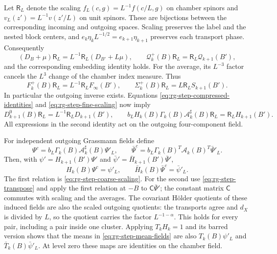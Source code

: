 \documentclass[11pt,letterpaper,reqno]{amsart}
\begin{document}
Let $\mathsf R_L$ denote the scaling
$f_L(c,g)=L^{-1}f(c/L,g)$ on chamber spinors and
$v_L(z')=L^{-1}v(z'/L)$ on unit spinors.
These are bijections between the corresponding
incoming and outgoing spaces. Scaling preserves
the label and the nested block centers, and
$e_k\eta_kL^{-1/2}=e_{k+1}\eta_{k+1}$ preserves
each transport phase. Consequently
\[
 (D_B+\mu)\mathsf R_L
       =L^{-1}\mathsf R_L(D_{B'}+L\mu),\qquad
 \mathcal Q_k^+(B)\mathsf R_L
       =\mathsf R_L\mathcal Q_{k+1}(B'),
\]
and the corresponding embedding identity holds.
For the average, its $L^{-3}$ factor cancels the
$L^3$ change of the chamber index measure.
Thus
\begin{equation}\label{eq:rg-step-fine-scaling}
 F_k^+(B)\mathsf R_L
                   =L^{-1}\mathsf R_LF_\infty(B'),\qquad
 \Sigma_k^+(B)\mathsf R_L
                         =L\mathsf R_LS_{k+1}(B').
\end{equation}
In particular the outgoing inverse exists.
Equations \eqref{eq:rg-step-compressed-identities} and
\eqref{eq:rg-step-fine-scaling} now imply
\begin{equation}\label{eq:rg-step-coarse-scaling}
 D_{k+1}^0(B)\mathsf R_L
                       =L^{-1}\mathsf R_LD_{k+1}(B'),\qquad
 b_LH_k(B)\Gamma_k(B)\mathcal A_k^\sharp(B)\mathsf R_L
                       =\mathsf R_LH_{k+1}(B').
\end{equation}
All expressions in the second identity act on the
outgoing four-component field.

For independent outgoing Grassmann fields define
\begin{equation}\label{eq:rg-step-mean-fields}
 \Psi^c=b_L\Gamma_k(B)\mathcal A_k^\sharp(B)\Psi'_L,\qquad
 \bar\Psi^c=b_L\Gamma_k(B)^T\mathcal A_k(B)^T\bar\Psi'_L.
\end{equation}
Then, with $\psi'=H_{k+1}(B')\Psi'$ and
$\bar\psi'=\bar H_{k+1}(B')\bar\Psi'$,
\begin{equation}\label{eq:rg-step-induced-fields}
 H_k(B)\Psi^c=\psi'_L,\qquad
 \bar H_k(B)\bar\Psi^c=\bar\psi'_L.
\end{equation}
The first relation is \eqref{eq:rg-step-coarse-scaling}.
For the second use \eqref{eq:rg-step-transpose}
and apply the first relation at $-B$ to
$\mathsf C\bar\Psi'$; the constant matrix
$\mathsf C$ commutes with scaling and the averages.
The covariant H\"older quotients of these induced
fields are also the scaled outgoing quotients:
the transports agree and $d_X$ is divided by $L$,
so the quotient carries the factor $L^{-1-\alpha}$.
This holds for every pair, including a pair inside
one cluster.
Applying $T_kH_k=1$ and its barred version shows
that the means in \eqref{eq:rg-step-mean-fields}
are also $T_k(B)\psi'_L$ and $\bar T_k(B)\bar\psi'_L$.
At level zero these maps are identities on
the chamber field.
\end{document}
